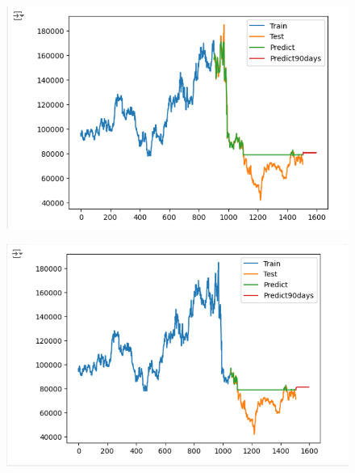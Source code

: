 \documentclass{article}
\begin{document}
\begin{multicols}{2}
\begin{figure}[H]
    \centering
    \begin{minipage}{0.15\textwidth}
    \centering
    \includegraphics[width=1\textwidth]{Image/GradientBoosting/LG_90_6_4_GradientBoostingRegressor.png}
   
    \label{fig:1}
    \end{minipage}%
    \begin{minipage}{0.15\textwidth}
    \centering
    \includegraphics[width=1\textwidth]{Image/GradientBoosting/LG_90_7_3_GradientBoostingRegressor.png}
  

\end{minipage}
\end{figure}
\end{multicols}
\end{document}
